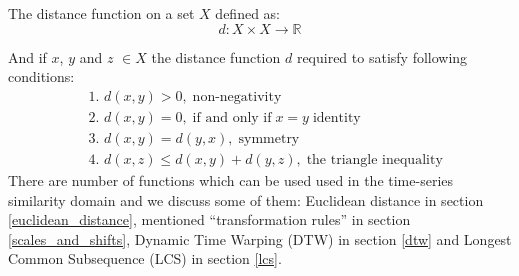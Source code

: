 The distance function on a set $X$ defined as:
\begin{equation}
 d: X \times X \rightarrow \mathbb{R}
\end{equation}

And if $x$, $y$ and $z$ $\in X$ the distance function $d$ required to satisfy following conditions:
\begin{align}
 & \text{1. } d(x, y) > 0, \; \text{non-negativity} \label{eq:d1} \\
 & \text{2. } d(x, y) = 0, \; \text{if and only if} \; x = y  \;  \text{identity} \\
 & \text{3. } d(x, y) = d(y, x), \; \text{symmetry} \\
 & \text{4. } d(x, z) \leq d(x, y) + d(y, z), \; \text{the triangle inequality} \label{eq:d4}
\end{align}
There are number of functions which can be used used in the time-series similarity domain and we discuss some of them: Euclidean distance in section \ref{euclidean_distance}, mentioned ``transformation rules'' in section \ref{scales_and_shifts}, Dynamic Time Warping (DTW) in section \ref{dtw} and Longest Common Subsequence (LCS) in section \ref{lcs}.
